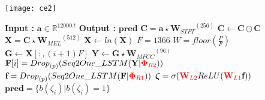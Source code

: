 \begin{algorithm}
\begin{minipage}{0.15\textwidth}
\texttt{[image: ce2]}
\end{minipage}
  \begin{minipage}{0.80\textwidth}
  \caption{$\textbf{pred}$ = $Model$($\textbf{a}$) }\label{exp:a3}
   {\fontsize{8}{0}
  \begin{algorithmic}[1]
    \Statex \textbf{Input :} $\textbf{a} \in \mathbb{R}^{12000.t}$
    \Statex \textbf{Output :} $\textbf{pred}$ 
    \State $\textbf{C} = \textbf{a} \star {\textbf{W}_{STFT}}^{(256)}$ 
    \State $\textbf{C} \leftarrow \textbf{C} \odot \textbf{C}$
    \State $\textbf{X} = \textbf{C} \star {\textbf{W}_{MEL}}^{(512)}$ 
    \State $\textbf{X} \leftarrow ln(\textbf{X})$
    \State $F = 1366$
    \State $W = floor(\frac{P}{F})$
      \State $ \textbf{G} \leftarrow \textbf{X}[:,(i+1)F]$
      \State $\textbf{Y} \leftarrow \textbf{G} \star {\textbf{W}_{MFCC}}^{(96)}$ 
      \State $\textbf{F}[i] = {Drop}_{(p)}(Seq2One\_LSTM(\textbf{Y} | {\color{red}\bm{\Phi}_{R2}} ))$ 
    \EndFor
    \State $\textbf{f} = {Drop}_{(p)}(Seq2One\_LSTM(\textbf{F} | {\color{red}\bm{\Phi}_{R1}}))$ 
    \State $\bm{\zeta} = \sigma ({\color{red} \textbf{W}_{L2}} ReLU ({\color{red}\textbf{W}_{L1}}\textbf{f})) $ 
    \State $\textbf{pred} = \{ b(\zeta_{i}) | b(\zeta_{i}) = 1 \}$ 
  \end{algorithmic}
  }
  \end{minipage}
\end{algorithm}
\FloatBarrier

